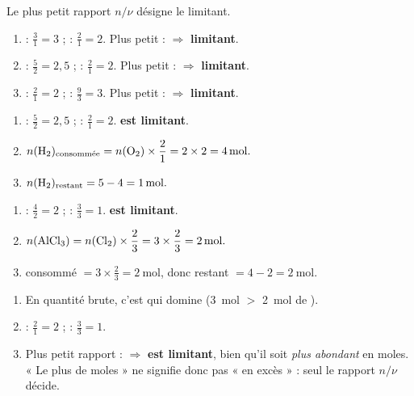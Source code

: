 \documentclass[11pt,a4paper]{article}
\begin{document}
\begin{corrige}
Le plus petit rapport $n/\nu$ désigne le limitant.
\begin{enumerate}[label=\alph*)]
  \item {} : $\frac{3}{1}=3$ ;  : $\frac{2}{1}=2$. Plus petit :  $\Rightarrow$
        \textbf{ limitant}.
  \item {} : $\frac{5}{2}=2,5$ ;  : $\frac{2}{1}=2$. Plus petit :  $\Rightarrow$
        \textbf{ limitant}.
  \item {} : $\frac{2}{1}=2$ ;  : $\frac{9}{3}=3$. Plus petit :  $\Rightarrow$
        \textbf{ limitant}.
\end{enumerate}
\end{corrige}

\begin{corrige}
\begin{enumerate}[label=\alph*)]
  \item {} : $\frac{5}{2}=2,5$ ;  : $\frac{2}{1}=2$. \textbf{ est limitant}.
  \item $n(\ce{H2})_{\text{consommée}}=n(\ce{O2})\times\dfrac{2}{1}=2\times2=\qty{4}{\mole}.$
  \item $n(\ce{H2})_{\text{restant}}=5-4=\qty{1}{\mole}.$
\end{enumerate}
\end{corrige}

\begin{corrige}
\begin{enumerate}[label=\alph*)]
  \item {} : $\frac{4}{2}=2$ ;  : $\frac{3}{3}=1$. \textbf{ est limitant}.
  \item $n(\ce{AlCl3})=n(\ce{Cl2})\times\dfrac{2}{3}=3\times\dfrac{2}{3}=\qty{2}{\mole}.$
  \item {} consommé $=3\times\frac{2}{3}=\qty{2}{\mole}$, donc restant $=4-2=\qty{2}{\mole}.$
\end{enumerate}
\end{corrige}

\begin{corrige}
\begin{enumerate}[label=\alph*)]
  \item En quantité brute, c'est  qui domine (\qty{3}{\mole} $>$ \qty{2}{\mole} de ).
  \item {} : $\frac{2}{1}=2$ ;  : $\frac{3}{3}=1$.
  \item Plus petit rapport :  $\Rightarrow$ \textbf{ est limitant}, bien qu'il soit
        \emph{plus abondant} en moles. « Le plus de moles » ne signifie donc pas « en excès » : seul
        le rapport $n/\nu$ décide.
\end{enumerate}
\end{corrige}
\end{document}
